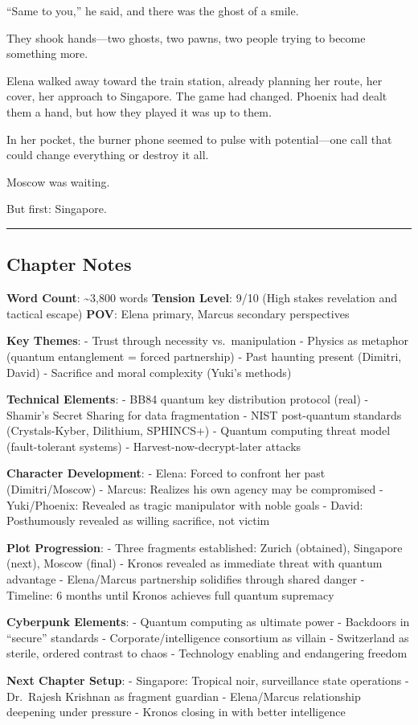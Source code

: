 ``Same to you,'' he said, and there was the ghost of a smile.

They shook hands---two ghosts, two pawns, two people trying to become something more.

Elena walked away toward the train station, already planning her route, her cover, her approach to Singapore. The game had changed. Phoenix had dealt them a hand, but how they played it was up to them.

In her pocket, the burner phone seemed to pulse with potential---one call that could change everything or destroy it all.

Moscow was waiting.

But first: Singapore.

\begin{center}\rule{0.5\linewidth}{0.5pt}\end{center}

\hypertarget{chapter-notes}{%
\subsection{Chapter Notes}\label{chapter-notes}}

\textbf{Word Count}: \textasciitilde3,800 words \textbf{Tension Level}: 9/10 (High stakes revelation and tactical escape) \textbf{POV}: Elena primary, Marcus secondary perspectives

\textbf{Key Themes}: - Trust through necessity vs.~manipulation - Physics as metaphor (quantum entanglement = forced partnership) - Past haunting present (Dimitri, David) - Sacrifice and moral complexity (Yuki's methods)

\textbf{Technical Elements}: - BB84 quantum key distribution protocol (real) - Shamir's Secret Sharing for data fragmentation - NIST post-quantum standards (Crystals-Kyber, Dilithium, SPHINCS+) - Quantum computing threat model (fault-tolerant systems) - Harvest-now-decrypt-later attacks

\textbf{Character Development}: - Elena: Forced to confront her past (Dimitri/Moscow) - Marcus: Realizes his own agency may be compromised - Yuki/Phoenix: Revealed as tragic manipulator with noble goals - David: Posthumously revealed as willing sacrifice, not victim

\textbf{Plot Progression}: - Three fragments established: Zurich (obtained), Singapore (next), Moscow (final) - Kronos revealed as immediate threat with quantum advantage - Elena/Marcus partnership solidifies through shared danger - Timeline: 6 months until Kronos achieves full quantum supremacy

\textbf{Cyberpunk Elements}: - Quantum computing as ultimate power - Backdoors in ``secure'' standards - Corporate/intelligence consortium as villain - Switzerland as sterile, ordered contrast to chaos - Technology enabling and endangering freedom

\textbf{Next Chapter Setup}: - Singapore: Tropical noir, surveillance state operations - Dr.~Rajesh Krishnan as fragment guardian - Elena/Marcus relationship deepening under pressure - Kronos closing in with better intelligence
